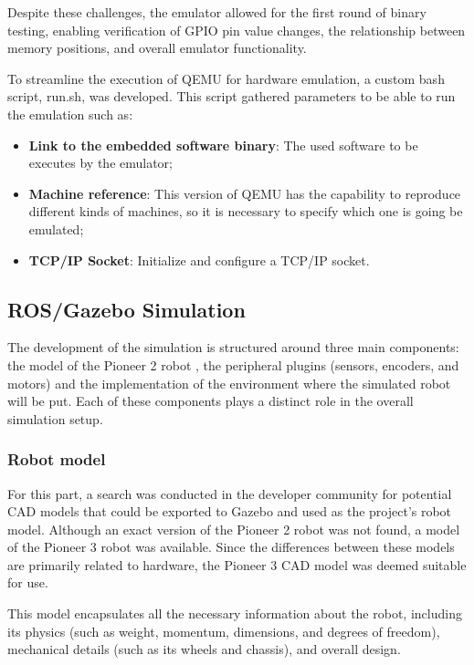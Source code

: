 \documentclass[../../monografia.tex]{subfiles}
\begin{document}
Despite these challenges, the emulator allowed for the first round of binary testing, enabling verification of GPIO pin value changes, the relationship between memory positions, and overall emulator functionality.

To streamline the execution of QEMU for hardware emulation, a custom bash script, run.sh, was developed. This script gathered parameters to be able to run the emulation such as:

\begin{itemize}
    \item \textbf{Link to the embedded software binary}: The used software to be executes by the emulator;
    \item \textbf{Machine reference}: This version of QEMU has the capability to reproduce different kinds of machines, so it is necessary to specify which one is going be emulated;
    \item \textbf{TCP/IP Socket}: Initialize and configure a TCP/IP socket.
\end{itemize}

\subsection{ROS/Gazebo Simulation}

The development of the simulation is structured around three main components: the model of the Pioneer 2 robot \cite{pioneer2dx_2024}, the peripheral plugins (sensors, encoders, and motors) and the implementation of the environment where the simulated robot will be put. Each of these components plays a distinct role in the overall simulation setup.

\subsubsection{Robot model}

For this part, a search was conducted in the developer community for potential CAD models \cite{CAD_23} that could be exported to Gazebo \cite{gazebo_21} and used as the project's robot model. Although an exact version of the Pioneer 2 robot was not found, a model of the Pioneer 3 robot was available. Since the differences between these models are primarily related to hardware, the Pioneer 3 \cite{Pioneer3_23} CAD model was deemed suitable for use.

This model \cite{Pioneer2_CAD_23} encapsulates all the necessary information about the robot, including its physics (such as weight, momentum, dimensions, and degrees of freedom), mechanical details (such as its wheels and chassis), and overall design.
\end{document}
